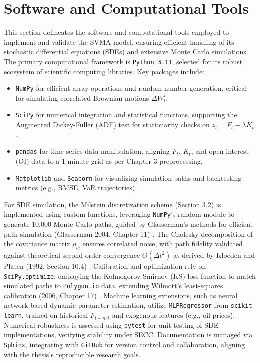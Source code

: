 \documentclass[12pt]{report}
\begin{document}
\section{Software and Computational Tools}
This section delineates the software and computational tools employed to implement and validate the SVMA model, ensuring efficient handling of its stochastic differential equations (SDEs) and extensive Monte Carlo simulations.
\vspace{0.2in}
The primary computational framework is \texttt{Python 3.11}, selected for its robust ecosystem of scientific computing libraries. Key packages include:
\begin{itemize}\setlength{\itemsep}{0pt}\setlength{\parskip}{4pt}
    \item \texttt{NumPy} for efficient array operations and random number generation, critical for simulating correlated Brownian motions \(\Delta W_t^i\).
    \item \texttt{SciPy} for numerical integration and statistical functions, supporting the Augmented Dickey-Fuller (ADF) test for stationarity checks on \(z_t = F_t - \lambda K_t\).
    \item \texttt{pandas} for time-series data manipulation, aligning \(F_t\), \(K_t\), and open interest (OI) data to a 1-minute grid as per Chapter 3 preprocessing.
    \item \texttt{Matplotlib} and \texttt{Seaborn} for visualizing simulation paths and backtesting metrics (e.g., RMSE, VaR trajectories).
\end{itemize}
For SDE simulation, the Milstein discretization scheme (Section 3.2) is implemented using custom functions, leveraging \texttt{NumPy}'s random module to generate 10,000 Monte Carlo paths, guided by Glasserman's methods for efficient path simulation (Glasserman 2004, Chapter 11) \cite{glasserman2004}. The Cholesky decomposition of the covariance matrix \(\rho_{ij}\) ensures correlated noise, with path fidelity validated against theoretical second-order convergence \(O(\Delta t^2)\) as derived by Kloeden and Platen (1992, Section 10.4) \cite{kloeden1992numerical}.
\vspace{0.2in}
Calibration and optimization rely on \texttt{SciPy.optimize}, employing the Kolmogorov-Smirnov (KS) loss function to match simulated paths to \texttt{Polygon.io} data, extending Wilmott's least-squares calibration (2006, Chapter 17) \cite{wilmott2006}. Machine learning extensions, such as neural network-based dynamic parameter estimation, utilize \texttt{MLPRegressor} from \texttt{scikit-learn}, trained on historical \(F_{t-n:t}\) and exogenous features (e.g., oil prices).
\vspace{0.2in}
Numerical robustness is assessed using \texttt{pytest} for unit testing of SDE implementations, verifying stability under SECC. Documentation is managed via \texttt{Sphinx}, integrating with \texttt{GitHub} for version control and collaboration, aligning with the thesis's reproducible research goals.
\end{document}
